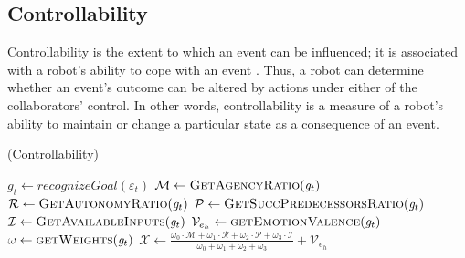 \documentclass{article}
\begin{document}

\subsection{Controllability}
\label{sec:controllability}
\vspace*{-1mm}
Controllability is the extent to which an event can be influenced; it is
associated with a robot's ability to cope with an event
\cite{gratch:domain-independent}. Thus, a robot can determine whether an event's
outcome can be altered by actions under either of the collaborators' control. In
other words, controllability is a measure of a robot's ability to maintain or
change a particular state as a consequence of an event.

\vspace*{-2mm}
\begin{algorithm}
	\caption{(Controllability)}
	\label{alg:controllability}
	\begin{algorithmic}[1]
 			\State $\mathit{g}_{t} \gets \textit{recognizeGoal}{(\varepsilon_t)}$
			\State $\mathcal{M} \gets \Call{GetAgencyRatio}{\mathit{g}_{t}}$ 
			\State $\mathcal{R} \gets \Call{GetAutonomyRatio}{\mathit{g}_{t}}$
			\State $\mathcal{P} \gets \Call{GetSuccPredecessorsRatio}{\mathit{g}_{t}}$
			\State $\mathcal{I} \gets \Call{GetAvailableInputs}{\mathit{g}_{t}}$
			\State $\mathcal{V}_{e_h} \gets \Call{getEmotionValence}{\mathit{g}_{t}}$ 
			\State $\omega \gets \Call{getWeights}{\mathit{g}_{t}}$
			\Statex
			\State $\mathcal{X} \gets
			\frac{\omega_{0}\cdot \mathcal{M} + \omega_{1}\cdot \mathcal{R} +
			\omega_{2}\cdot \mathcal{P} + \omega_{3}\cdot \mathcal{I}}{\omega_{0} +
			\omega_{1} + \omega_{2} + \omega_{3}} + \mathcal{V}_{e_h}$
  			\Statex
			 \quad {}
			\Else \quad {}
			\EndIf
		\EndFunction
	\end{algorithmic}
\end{algorithm}
\end{document}
